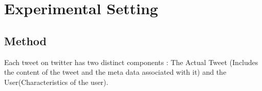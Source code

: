 \part{Experimental Setting}
\chapter{Method}

Each tweet on twitter has two distinct components : The Actual Tweet (Includes the content of the tweet and the meta data associated with it) and the User(Characteristics of the user). 